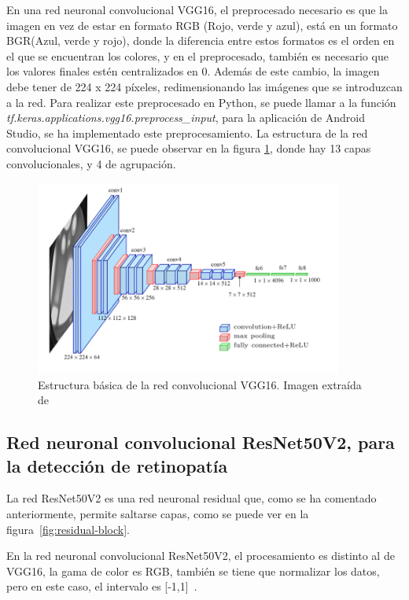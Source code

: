En una red neuronal convolucional VGG16, el preprocesado necesario es que la imagen en vez de estar en formato RGB (Rojo, verde y azul), está en un formato BGR(Azul, verde y rojo), donde la diferencia entre estos formatos es el orden en el que se encuentran los colores, y en el preprocesado, también es necesario que los valores finales estén centralizados en 0. Además de este cambio, la imagen debe tener de 224 x 224 píxeles, redimensionando las imágenes que se introduzcan a la red.
\cite{tensorflowVGG16}
Para realizar este preprocesado en Python, se puede llamar a la función \textit{tf.keras.applications.vgg16.preprocess\_input}, para la aplicación de Android Studio, se ha implementado este preprocesamiento.
La estructura de la red convolucional VGG16, se puede observar en la figura \ref{fig:VGG-16-struct}, donde hay 13 capas convolucionales, y  4 de agrupación. 
\begin{figure}[!ht]
         \centering
         \includegraphics[width=0.9\textwidth]{img/VGG-16-network-architecture.png}
         \caption{Estructura básica de la red convolucional VGG16. Imagen extraída de~\cite{vgg16-structure}}
         \label{fig:VGG-16-struct}
\end{figure}


\subsection{Red neuronal convolucional ResNet50V2, para la detección de retinopatía}

La red ResNet50V2 es una red neuronal residual que, como se ha comentado anteriormente, permite saltarse capas, como se puede ver en la figura~\ref{fig:residual-block}.

En la red neuronal convolucional ResNet50V2, el procesamiento es distinto al de VGG16, la gama de color es RGB, también se tiene que normalizar los datos, pero en este caso, el intervalo es [-1,1]~\cite{tensorflowResNet50V2}.

